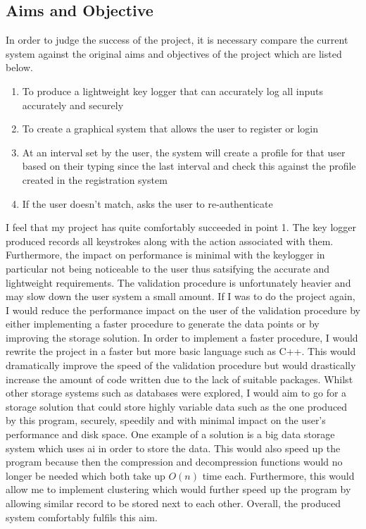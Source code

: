 \documentclass[10pt,a4paper]{report}
\begin{document}
\subsection{Aims and Objective}

In order to judge the success of the project, it is necessary compare the current system against the original aims and objectives of the project which are listed below. 

\begin{enumerate}
	\item To produce a lightweight key logger that can accurately log all inputs accurately and securely
	\item To create a graphical system that allows the user to register or login
	\item At an interval set by the user, the system will create a profile for that user based on their typing since the last interval and check this against the profile created in the registration system
	\item If the user doesn't match, asks the user to re-authenticate
\end{enumerate}

I feel that my project has quite comfortably succeeded in point 1. The key logger produced records all keystrokes along with the action associated with them. Furthermore, the impact on performance is minimal with the keylogger in particular not being noticeable to the user thus satsifying the accurate and lightweight requirements. The validation procedure is unfortunately heavier and may slow down the user system a small amount. If I was to do the project again, I would reduce the performance impact on the user of the validation procedure by either implementing a faster procedure to generate the data points or by improving the storage solution. In order to implement a faster procedure, I would rewrite the project in a faster but more basic language such as C++. This would dramatically improve the speed of the validation procedure but would drastically increase the amount of code written due to the lack of suitable packages. Whilst other storage systems such as databases were explored, I would aim to go for a storage solution that could store highly variable data such as the one produced by this program, securely, speedily and with minimal impact on the user's performance and disk space. One example of a solution is a big data storage system which uses ai in order to store the data. This would also speed up the program because then the compression and decompression functions would no longer be needed which both take up \(O(n)\) time each. Furthermore, this would allow me to implement clustering which would further speed up the program by allowing similar record to be stored next to each other. Overall, the produced system comfortably fulfils this aim.
\end{document}
